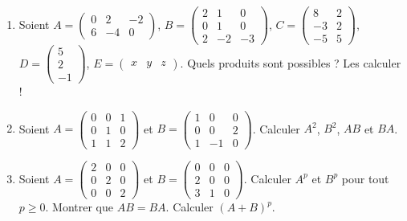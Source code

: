 \documentclass[class=report,crop=false]{standalone}
\begin{document}
\begin{miniexercices}
\sauteligne
\begin{enumerate}
  \item Soient
  $A=\left(\begin{smallmatrix}0&2&-2\\6&-4&0\end{smallmatrix} \right)$,
  $B=\left(\begin{smallmatrix}2&1&0\\0&1&0\\2&-2&-3\end{smallmatrix} \right)$,
  $C=\left(\begin{smallmatrix}8&2\\-3&2\\-5&5\end{smallmatrix} \right)$,
  $D=\left(\begin{smallmatrix}5\\2\\-1\end{smallmatrix} \right)$,
  $E=\left(\begin{matrix}x&y&z\end{matrix} \right)$.
  Quels produits sont possibles ? Les calculer !

  \item Soient $A= \left(\begin{smallmatrix}0&0&1\\0&1&0\\1&1&2 \end{smallmatrix} \right)$
  et $B=\left(\begin{smallmatrix}1&0&0\\0&0&2\\1&-1&0\end{smallmatrix} \right)$.
  Calculer $A^2$, $B^2$, $AB$ et $BA$.

  \item Soient $A= \left(\begin{smallmatrix} 2&0&0\\0&2&0\\0&0&2\end{smallmatrix} \right)$
  et $B=\left(\begin{smallmatrix}0&0&0\\2&0&0\\3&1&0\end{smallmatrix} \right)$.
  Calculer $A^p$ et $B^p$ pour tout $p\ge0$. Montrer que $AB=BA$. Calculer $(A+B)^p$.

\end{enumerate}
\end{miniexercices}
\end{document}
